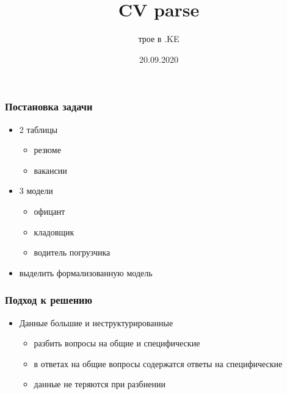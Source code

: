 \documentclass[xcolor=table,xetex,mathserif,serif]{beamer}
\title{CV parse}
\author[трое в .KE]{трое в .KE}
\date{20.09.2020}
\begin{document}
\begin{frame}
	\titlepage{}
\end{frame}


\begin{frame}
	\frametitle{Постановка задачи}

	\begin{itemize}
		\item 2 таблицы
		      \begin{itemize}
			      \item резюме
			      \item вакансии
		      \end{itemize}
		\item 3 модели
		      \begin{itemize}
			      \item офицант
			      \item кладовщик
			      \item водитель погрузчика
		      \end{itemize}
		\item выделить формализованную модель
	\end{itemize}
\end{frame}


\begin{frame}
	\frametitle{Подход к решению}

	\begin{itemize}
		\item Данные большие и неструктурированные
		      \begin{itemize}
			      \item разбить вопросы на общие и специфические
			      \item в ответах на общие вопросы содержатся ответы на специфические
			      \item данные не теряются при разбиении
		      \end{itemize}
	\end{itemize}
\end{frame}
\end{document}

